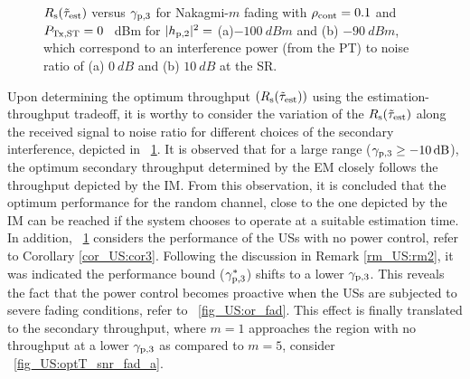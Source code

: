 \begin{figure}[!ht]
{
\label{fig_US:optT_snr_fad_b}
}
\vspace{-2mm}
\caption{$R_{\text{s}}(\tilde{\tau}_{\text{est}})$ versus ${\gamma}_{\text{p,3}}$ for Nakagmi-$m$ fading with $\rho_{\text{cont}} = 0.1$ and $P_{\text{Tx,ST}} = 0$ \SI{}{dBm} for $|h_{\text{p,2}}|^2 =$ (a)$\SI{-100}{dBm}$ and (b) $ \SI{-90}{dBm}$, which correspond to an interference power (from the PT) to noise ratio of (a) $\SI{0}{dB}$ and (b) $\SI{10}{dB}$ at the SR.}
\label{fig_US:optT_snr_fad}
\end{figure}

Upon determining the optimum throughput $(R_{\text{s}}(\tilde{\tau}_{\text{est}}))$ using the estimation-throughput tradeoff, it is worthy to consider the variation of the $R_{\text{s}}(\tilde{\tau}_{\text{est}})$ along the received signal to noise ratio for different choices of the secondary interference, depicted in \figurename~\ref{fig_US:optT_snr_fad}. It is observed that for a large range (${\gamma}_{\text{p,3}} \ge \SI{-10}{dB}$), the optimum secondary throughput determined by the EM closely follows the throughput depicted by the IM. From this observation, it is concluded that the optimum performance for the random channel, close to the one depicted by the IM can be reached if the system chooses to operate at a suitable estimation time. In addition, \figurename~\ref{fig_US:optT_snr_fad} considers the performance of the USs with no power control, refer to Corollary \ref{cor_US:cor3}. Following the discussion in Remark \ref{rm_US:rm2}, it was indicated the performance bound (${\gamma}_{\text{p,3}}^*$) shifts to a lower ${\gamma}_{\text{p,3}}$. This reveals the fact that the power control becomes proactive when the USs are subjected to severe fading conditions, refer to \figurename~\ref{fig_US:or_fad}. This effect is finally translated to the secondary throughput, where $m = 1$ approaches the region with no throughput at a lower ${\gamma}_{\text{p,3}}$ as compared to $m = 5$, consider \figurename~\ref{fig_US:optT_snr_fad_a}. 

